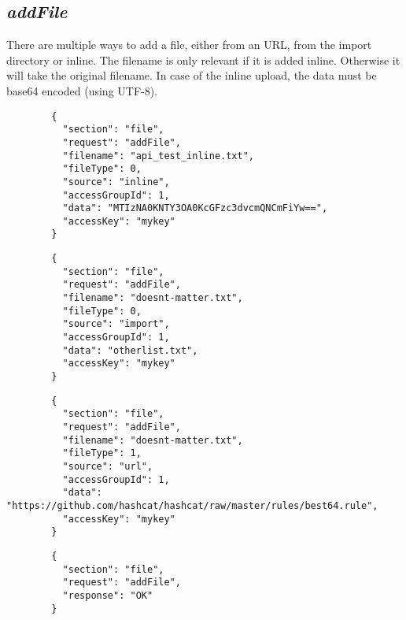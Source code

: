 \subsection*{\textit{addFile}}
	There are multiple ways to add a file, either from an URL, from the import directory or inline. The filename is only relevant if it is added inline. Otherwise it will take the original filename. In case of the inline upload, the data must be base64 encoded (using UTF-8).
	{
		\color{blue}
		\begin{verbatim}
		{
		  "section": "file",
		  "request": "addFile",
		  "filename": "api_test_inline.txt",
		  "fileType": 0,
		  "source": "inline",
		  "accessGroupId": 1,
		  "data": "MTIzNA0KNTY3OA0KcGFzc3dvcmQNCmFiYw==",
		  "accessKey": "mykey"
		}
		\end{verbatim}
	}
	{
		\color{blue}
		\begin{verbatim}
		{
		  "section": "file",
		  "request": "addFile",
		  "filename": "doesnt-matter.txt",
		  "fileType": 0,
		  "source": "import",
		  "accessGroupId": 1,
		  "data": "otherlist.txt",
		  "accessKey": "mykey"
		}
		\end{verbatim}
	}
	{
		\color{blue}
		\begin{verbatim}
		{
		  "section": "file",
		  "request": "addFile",
		  "filename": "doesnt-matter.txt",
		  "fileType": 1,
		  "source": "url",
		  "accessGroupId": 1,
		  "data": "https://github.com/hashcat/hashcat/raw/master/rules/best64.rule",
		  "accessKey": "mykey"
		}
		\end{verbatim}
	}
	{
		\color{OliveGreen}
		\begin{verbatim}
		{
		  "section": "file",
		  "request": "addFile",
		  "response": "OK"
		}
		\end{verbatim}
	}








